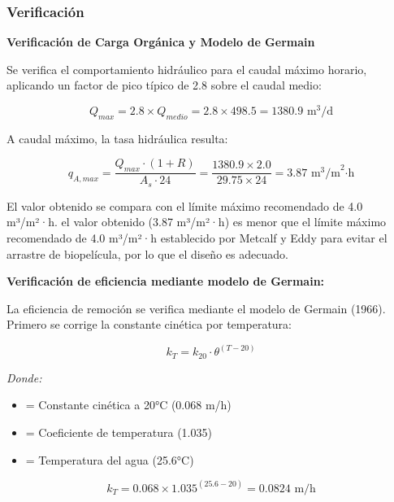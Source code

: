 \documentclass[12pt,a4paper]{article}
\begin{document}
\subsubsection{Verificación}

\textbf{Verificación de Carga Orgánica y Modelo de Germain}

Se verifica el comportamiento hidráulico para el caudal máximo horario, aplicando un factor de pico típico de 2.8 sobre el caudal medio:

\begin{equation}
Q_{max} = 2.8 \times Q_{medio} = 2.8 \times 498.5 = 1380.9 \text{ m}^3\text{/d}
\end{equation}

A caudal máximo, la tasa hidráulica resulta:

\begin{equation}
q_{A,max} = \frac{Q_{max} \cdot (1 + R)}{A_s \cdot 24} = \frac{1380.9 \times 2.0}{29.75 \times 24} = 3.87 \text{ m}^3\text{/m}^2\text{·h}
\end{equation}

El valor obtenido se compara con el límite máximo recomendado de 4.0 m³/m²·h. el valor obtenido (3.87 m³/m²·h) es menor que el límite máximo recomendado de 4.0 m³/m²·h establecido por Metcalf y Eddy para evitar el arrastre de biopelícula, por lo que el diseño es adecuado.

\textbf{Verificación de eficiencia mediante modelo de Germain:}

La eficiencia de remoción se verifica mediante el modelo de Germain (1966). Primero se corrige la constante cinética por temperatura:

\begin{equation}
k_T = k_{20} \cdot \theta^{(T-20)}
\end{equation}

\textit{Donde:}
\begin{itemize}[noitemsep,leftmargin=2em]
    \item[$k_{20}$] = Constante cinética a 20°C (0.068 m/h)
    \item[$\theta$] = Coeficiente de temperatura (1.035)
    \item[$T$] = Temperatura del agua (25.6°C)
\end{itemize}

\begin{equation}
k_T = 0.068 \times 1.035^{(25.6-20)} = 0.0824 \text{ m/h}
\end{equation}
\end{document}

